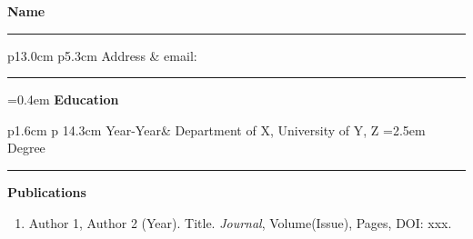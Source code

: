 \documentclass[a4paper,10pt]{article}
\begin{document}
\begin{center}
\textbf{ \Large Name}
\end{center}

\noindent\rule[0.1ex]{\linewidth}{0pt}
\begin{tabular}{ p{13.0cm} p{5.3cm} }
Address & email:
\end{tabular}

\noindent\rule[0.5ex]{\linewidth}{1pt}
\hangindent=0.4em \textbf{\large  Education}
\begin{center}
\begin{tabular}{ p{1.6cm} p {14.3cm}}
\noindent Year-Year& Department of X, University of Y, Z
\newline  \hangindent=2.5em Degree
\end{tabular}
\end{center}
\vspace{0.3cm}

\pagebreak


\noindent\rule[0.5ex]{\linewidth}{0pt}
\textbf{\large Publications}
\begin{enumerate}
\item Author 1, Author 2 (Year). Title.  {\textit{Journal}}, {Volume(Issue)}, {Pages}, DOI: xxx.

\end{enumerate}
\end{document}
